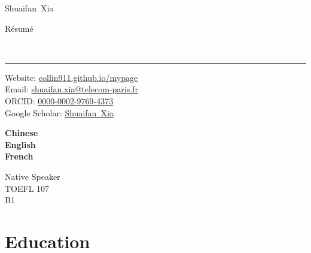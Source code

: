 \documentclass[9pt,a4paper]{article}
\makeatletter
\newcommand{\Title}{Résumé}
\newcommand{\FirstName}{Shuaifan}
\newcommand{\LastName}{Xia}
\newcommand{\MyName}{\FirstName\ \LastName}
\newcommand{\Email}{shuaifan.xia@telecom-paris.fr}
\newcommand{\PersonalWebsite}{collin911.github.io/mypage}
\newcommand{\ORCID}{0000-0002-9769-4373}
\newcommand{\Website}[1]{\href{https://#1}{#1}}
\makeatother
\begin{document}
\begin{minipage}[t]{0.5\textwidth}
  {\fontsize{20pt}{0}\selectfont\MyName}
\end{minipage}
\begin{minipage}[t]{0.5\textwidth}
  \begin{flushright}
    \Title{}
  \end{flushright}
\end{minipage}
\\[-0.1cm]
\textcolor{lightgray}{\rule{\textwidth}{3pt}}
\begin{minipage}[t]{0.75\textwidth}
  Website: \Website{\PersonalWebsite}
  \\
  Email: \href{mailto:\Email}{\Email}
  \\
  ORCID: \href{https://orcid.org/\ORCID}{\ORCID}
  \\
  Google Scholar: \href{https://scholar.google.com/citations?user=x4Y8uCAAAAAJ}{\MyName}
\end{minipage}
\begin{minipage}[t]{0.07\textwidth}
    \textbf{Chinese} 
    \\
    \textbf{English} 
    \\
    \textbf{French} 
    \\
\end{minipage}
\begin{minipage}[t]{0.18\textwidth}
  \begin{flushright}
    Native Speaker
    \\
    TOEFL 107
    \\
    B1
    \\
  \end{flushright}
\end{minipage}


\section{Education}
\end{document}
